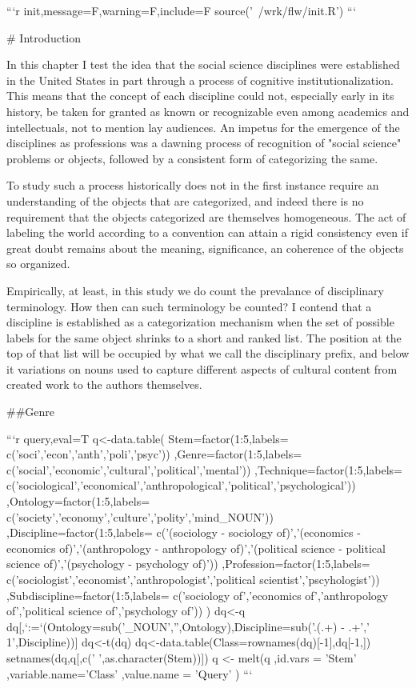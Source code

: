 \documentclass{article}
\begin{document}


```{r init,message=F,warning=F,include=F}
source('~/wrk/flw/init.R')
```


# Introduction

In this chapter I test the idea that the social science disciplines were established in the United States in part through a process of cognitive institutionalization. This means that the concept of each discipline could not, especially early in its history, be taken for granted as known or recognizable even among academics and intellectuals, not to mention lay audiences. An impetus for the emergence of the disciplines as professions was a dawning process of recognition of "social science" problems or objects, followed by a consistent form of categorizing the same.

To study such a process historically does not in the first instance require an understanding of the objects that are categorized, and indeed there is no requirement that the objects categorized are themselves homogeneous. The act of labeling the world according to a convention can attain a rigid consistency even if great doubt remains about the meaning, significance, an coherence of the objects so organized.

Empirically, at least, in this study we do count the prevalance of disciplinary terminology. How then can such terminology be counted? I contend that a discipline is established as a categorization mechanism when the set of possible labels for the same object shrinks to a short and ranked list. The position at the top of that list will be occupied by what we call the disciplinary prefix, and below it variations on nouns used to capture different aspects of cultural content from created work to the authors themselves.

##Genre


```{r query,eval=T}
q<-data.table(
 Stem=factor(1:5,labels=
 c('soci','econ','anth','poli','psyc'))
 ,Genre=factor(1:5,labels=
 c('social','economic','cultural','political','mental'))
 ,Technique=factor(1:5,labels=
 c('sociological','economical','anthropological','political','psychological'))
 ,Ontology=factor(1:5,labels=
 c('society','economy','culture','polity','mind_NOUN'))
 ,Discipline=factor(1:5,labels=
 c('(sociology - sociology of)','(economics - economics of)','(anthropology - anthropology of)','(political science  - political science of)','(psychology - psychology of)'))
 ,Profession=factor(1:5,labels=
 c('sociologist','economist','anthropologist','political scientist','pscyhologist'))
 ,Subdiscipline=factor(1:5,labels=
 c('sociology of','economics of','anthropology of','political science of','psychology of'))
)
dq<-q
dq[,`:=`(Ontology=sub('_NOUN','',Ontology),Discipline=sub('.(.+) - .+','\\1',Discipline))]
dq<-t(dq)
dq<-data.table(Class=rownames(dq)[-1],dq[-1,])
setnames(dq,q[,c(' ',as.character(Stem))])
q <- melt(q
,id.vars = 'Stem'
,variable.name='Class'
,value.name = 'Query'
)
```
\end{document}
